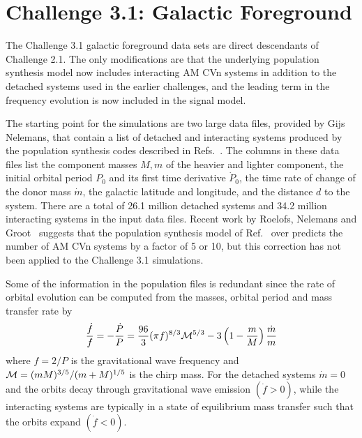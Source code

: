 \documentclass[12pt]{article}
\begin{document}
 

\section{Challenge 3.1: Galactic Foreground}

The Challenge 3.1 galactic foreground data sets are direct descendants of Challenge 2.1.
The only modifications are that the underlying population synthesis model now includes interacting
AM CVn systems in addition to the detached systems used in the earlier
challenges, and the leading term in the frequency evolution is now
included in the signal model.

The starting point for the simulations are two large data files,
provided by Gijs Nelemans, that contain a list of detached and
interacting systems produced by the population synthesis codes
described in Refs.~\cite{Nelemans:2001hp, Nelemans:2003ha}. The
columns in these data files list the component masses $M,m$ of
the heavier and lighter component, the initial orbital
period $P_0$ and its first time derivative $\dot{P}_0$, the
time rate of change of the donor mass $\dot{m}$, the galactic latitude
and longitude, and the distance $d$ to the system. There are a total
of  26.1 million detached systems and 34.2 million interacting systems
in the input data files. Recent work by Roelofs, Nelemans and
Groot~\cite{Roelofs:2007rn} suggests that the population
synthesis model of Ref.~\cite{Nelemans:2003ha} over predicts the
number of AM CVn systems by a factor of 5 or 10, but this
correction has not been applied to the Challenge 3.1 simulations.

Some of the information in the population files is redundant since the
rate of orbital evolution can be computed from the masses, orbital
period and mass transfer rate by
\begin{equation}
\frac{\dot{f}}{f} = -\frac{\dot{P}}{P} = 
\frac{96}{3}(\pi f)^{8/3}{\cal M}^{5/3}  
- 3 \left(1 - \frac{m}{M}\right) \frac{\dot{m}}{m}
\end{equation}
where $f=2/P$ is the gravitational wave frequency and
${\cal M} = (mM)^{3/5}/(m+M)^{1/5}$ is the chirp mass. For the detached
systems $\dot{m}=0$ and the orbits decay through
gravitational wave emission $(\dot{f} >0)$, while the interacting
systems are typically in a state of equilibrium mass transfer such that
the orbits expand $(\dot{f} < 0)$.
\end{document}
